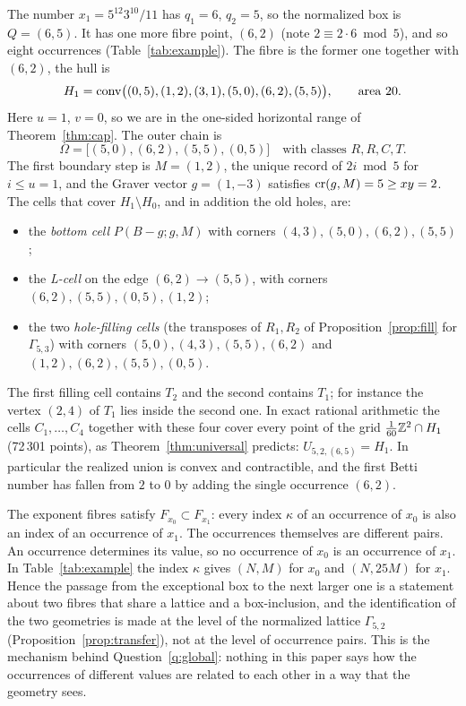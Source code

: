 The number $x_1=5^{12}3^{10}/11$ has $q_1=6$, $q_2=5$, so the normalized box is $Q=(6,5)$. It has one more fibre point, $(6,2)$ (note $2\equiv2\cdot6\bmod5$), and so eight occurrences (Table~\ref{tab:example}). The fibre is the former one together with $(6,2)$, the hull is
\[
  H_1=\operatorname{conv}\bigl((0,5),(1,2),(3,1),(5,0),(6,2),(5,5)\bigr),\qquad\text{area }20.
\]
Here $u=1$, $v=0$, so we are in the one-sided horizontal range of Theorem~\ref{thm:cap}. The outer chain is
\[
  \Omega=\bigl[(5,0),(6,2),(5,5),(0,5)\bigr]\quad\text{with classes }R,R,C,T.
\]
The first boundary step is $M=(1,2)$, the unique record of $2i\bmod5$ for $i\le u=1$, and the Graver vector $g=(1,-3)$ satisfies $\operatorname{cr}(g,M)=5\ge xy=2$. The cells that cover $H_1\setminus H_0$, and in addition the old holes, are:
\begin{itemize}
\item the \emph{bottom cell} $P(B-g;g,M)$ with corners $(4,3),(5,0),(6,2),(5,5)$;
\item the \emph{L-cell} on the edge $(6,2)\to(5,5)$, with corners $(6,2),(5,5),(0,5),(1,2)$;
\item the two \emph{hole-filling cells} (the transposes of $R_1,R_2$ of Proposition~\ref{prop:fill} for $\Gamma_{5,3}$) with corners $(5,0),(4,3),(5,5),(6,2)$ and $(1,2),(6,2),(5,5),(0,5)$.
\end{itemize}
The first filling cell contains $T_2$ and the second contains $T_1$; for instance the vertex $(2,4)$ of $T_1$ lies inside the second one. In exact rational arithmetic the cells $C_1,\dots,C_4$ together with these four cover every point of the grid $\tfrac1{60}\mathbb Z^2\cap H_1$ (72\,301 points), as Theorem~\ref{thm:universal} predicts: $U_{5,2,(6,5)}=H_1$. In particular the realized union is convex and contractible, and the first Betti number has fallen from $2$ to $0$ by adding the single occurrence $(6,2)$.

\begin{remark}\label{rem:x0x1}
The exponent fibres satisfy $F_{x_0}\subset F_{x_1}$: every index $\kappa$ of an occurrence of $x_0$ is also an index of an occurrence of $x_1$. The occurrences themselves are different pairs. An occurrence determines its value, so no occurrence of $x_0$ is an occurrence of $x_1$. In Table~\ref{tab:example} the index $\kappa$ gives $(N,M)$ for $x_0$ and $(N,25M)$ for $x_1$. Hence the passage from the exceptional box to the next larger one is a statement about two fibres that share a lattice and a box-inclusion, and the identification of the two geometries is made at the level of the normalized lattice $\Gamma_{5,2}$ (Proposition~\ref{prop:transfer}), not at the level of occurrence pairs. This is the mechanism behind Question~\ref{q:global}: nothing in this paper says how the occurrences of different values are related to each other in a way that the geometry sees.
\end{remark}


